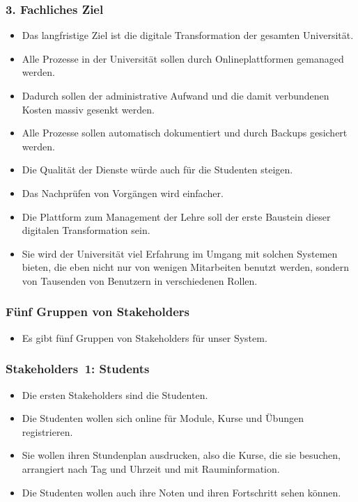 \documentclass[aspectratio=169,mathserif,notheorems]{beamer}%
\begin{document}
\begin{frame}%
\frametitle{3. Fachliches Ziel}%
\begin{itemize}%
%
\item Das langfristige Ziel ist die digitale Transformation der gesamten Universität.%
%
\item<2-> Alle Prozesse in der Universität sollen durch Onlineplattformen gemanaged werden.%
%
\item<3-> Dadurch sollen der administrative Aufwand und die damit verbundenen Kosten massiv gesenkt werden.%
%
\item<4-> Alle Prozesse sollen automatisch dokumentiert und durch Backups gesichert werden.%
%
\item<5-> Die Qualität der Dienste würde auch für die Studenten steigen.%
%
\item<6-> Das Nachprüfen von Vorgängen wird einfacher.%
%
\item<7-> Die Plattform zum Management der Lehre soll der erste Baustein dieser digitalen Transformation sein.%
%
\item<8-> Sie wird der Universität viel Erfahrung im Umgang mit solchen Systemen bieten, die eben nicht nur von wenigen Mitarbeiten benutzt werden, sondern von Tausenden von Benutzern in verschiedenen Rollen.%
%
\end{itemize}%
\end{frame}%
%
%
\begin{frame}%
\frametitle{Fünf Gruppen von Stakeholders}%
\begin{itemize}%
\item Es gibt fünf Gruppen von Stakeholders für unser System.%
\end{itemize}%
\end{frame}%
%
\begin{frame}%
\frametitle{Stakeholders~1: Students}%
\begin{itemize}%
\item Die ersten Stakeholders sind die Studenten.%
\item<2-> Die Studenten wollen sich online für Module, Kurse und Übungen registrieren.%
\item<3-> Sie wollen ihren Stundenplan ausdrucken, also die Kurse, die sie besuchen, arrangiert nach Tag und Uhrzeit und mit Rauminformation.%
\item<4-> Die Studenten wollen auch ihre Noten und ihren Fortschritt sehen können.%
\end{itemize}%
\end{frame}%
%
\end{document}
